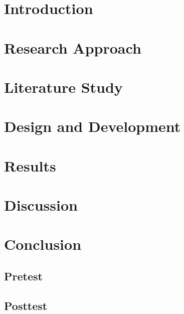 \documentclass[12pt,a4paper]{book}
\newcommand{\blankpage}[0]{
	\newpage
	\thispagestyle{plain}
	\mbox{}
}
\begin{document}
\hypersetup{pageanchor=false}

\blankpage	
\cleardoublepage
\frontmatter



\tableofcontents
\listoftables
\listoffigures
\hypersetup{pageanchor=true}

\mainmatter
\part{Introduction}\label{part:introduction}


\part{Research Approach}\label{part:approach}


\part{Literature Study}\label{part:literature}


\part{Design and Development}\label{part:development}


\part{Results}\label{part:results}


\part{Discussion}\label{part:discussion}


\part{Conclusion}\label{part:conslusion}


\clearpage


\begin{appendices}
	\chapter{Pretest}\label{appendix:pretest}
		
	\chapter{Posttest}\label{appendix:posttest}
			
\end{appendices}
\end{document}
